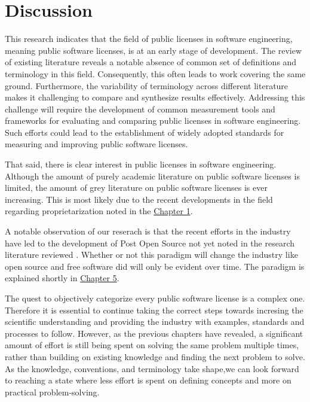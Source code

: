 \chapter{Discussion\label{discussion}}
This research indicates that the field of public licenses in software engineering, meaning public software licenses, is at an early stage of development. The review of existing literature reveals a notable absence of common set of definitions and terminology in this field. Consequently, this often leads to work covering the same ground. Furthermore, the variability of terminology across different literature makes it challenging to compare and synthesize results effectively. Addressing this challenge will require the development of common measurement tools and frameworks for evaluating and comparing public licenses in software engineering. Such efforts could lead to the establishment of widely adopted standards for measuring and improving public software licenses.

That said, there is clear interest in public licenses in software engineering. Although the amount of purely academic literature on public software licenses is limited, the amount of grey literature on public software licenses is ever increasing. This is most likely due to the recent developments in the field regarding proprietarization noted in the \hyperref[intro]{Chapter 1}. 

A notable observation of our reserach is that the recent efforts in the industry have led to the development of Post Open Source not yet noted in the research literature reviewed \citep{register:poss}. Whether or not this paradigm will change the industry like open source and free software did will only be evident over time. The paradigm is explained shortly in \hyperref[conclusions]{Chapter 5}.

The quest to objectively categorize every public software license is a complex one. Therefore it is essential to continue taking the correct steps towards incresing the scientific understanding and providing the industry with examples, standards and processes to follow. However, as the previous chapters have revealed, a significant amount of effort is still being spent on solving the same problem multiple times, rather than building on existing knowledge and finding the next problem to solve. As the knowledge, conventions, and terminology take shape,we can look forward to reaching a state where less effort is spent on defining concepts and more on practical problem-solving.

